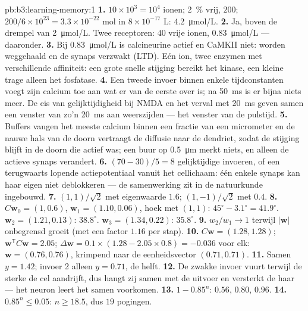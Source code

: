 \begin{solution}{pb:b3:learning-memory:1}
\textbf{1.} $10\times 10^{3} = 10^{4}$ ionen; \qty{2}{\%} vrij, $200$;
$200/6\times 10^{23} = 3.3\times 10^{-22}$ mol in $8\times 10^{-17}$ L:
\qty{4.2}{\micro mol/L}.
\textbf{2.} Ja, boven de drempel van \qty{2}{\micro mol/L}. Twee
receptoren: $40$ vrije ionen, \qty{0.83}{\micro mol/L} --- daaronder.
\textbf{3.} Bij \qty{0.83}{\micro mol/L} is calcineurine actief en
CaMKII niet:  worden weggehaald en de synaps verzwakt
(LTD). Eén ion, twee enzymen met verschillende affiniteit: een grote
snelle stijging bereikt het kinase, een kleine trage alleen het
fosfatase.
\textbf{4.} Een tweede invoer binnen enkele tijdconstanten voegt zijn
calcium toe aan wat er van de eerste over is; na \qty{50}{ms} is er
bijna niets meer. De eis van gelijktijdigheid bij NMDA en het verval
met \qty{20}{ms} geven samen een venster van zo'n \qty{20}{ms} aan
weerszijden --- het venster van de pulstijd.
\textbf{5.} Buffers vangen het meeste calcium binnen een fractie van
een micrometer en de nauwe hals van de doorn vertraagt de diffusie naar
de dendriet, zodat de stijging blijft in de doorn die actief was; een
buur op \qty{0.5}{\micro m} merkt niets, en alleen de actieve synaps
verandert.
\textbf{6.} $(70 - 30)/5 = 8$ gelijktijdige invoeren, of een
terugwaarts lopende actiepotentiaal vanuit het cellichaam: één enkele
synaps kan haar eigen  niet deblokkeren --- de
samenwerking zit in de natuurkunde ingebouwd.
\textbf{7.} $(1,1)/\sqrt{2}$ met eigenwaarde $1.6$; $(1,-1)/\sqrt{2}$
met $0.4$.
\textbf{8.} $C\mathbf{w}_{0} = (1, 0.6)$, $\mathbf{w}_{1} = (1.10,
0.06)$, hoek met $(1,1)$: $45^{\circ} - 3.1^{\circ} = 41.9^{\circ}$.
$\mathbf{w}_{2} = (1.21, 0.13)$: $38.8^{\circ}$. $\mathbf{w}_{3} = (1.34,
0.22)$: $35.8^{\circ}$.
\textbf{9.} $w_{2}/w_{1} \to 1$ terwijl $|\mathbf{w}|$ onbegrensd groeit
(met een factor $1.16$ per stap).
\textbf{10.} $C\mathbf{w} = (1.28, 1.28)$; $\mathbf{w}^{\mathsf{T}}C
\mathbf{w} = 2.05$; $\Delta\mathbf{w} = 0.1\times(1.28 - 2.05\times 0.8)
= -0.036$ voor elk: $\mathbf{w} = (0.76, 0.76)$, krimpend naar de
eenheidsvector $(0.71, 0.71)$.
\textbf{11.} Samen $y = 1.42$; invoer 2 alleen $y = 0.71$, de helft.
\textbf{12.} De zwakke invoer vuurt terwijl de sterke de cel aandrijft,
dus hangt zij samen met de uitvoer en versterkt de  haar
--- het neuron leert het samen voorkomen.
\textbf{13.} $1 - 0.85^{n}$: $0.56$, $0.80$, $0.96$.
\textbf{14.} $0.85^{n} \le 0.05$: $n \ge 18.5$, dus $19$ pogingen.

\end{solution}
